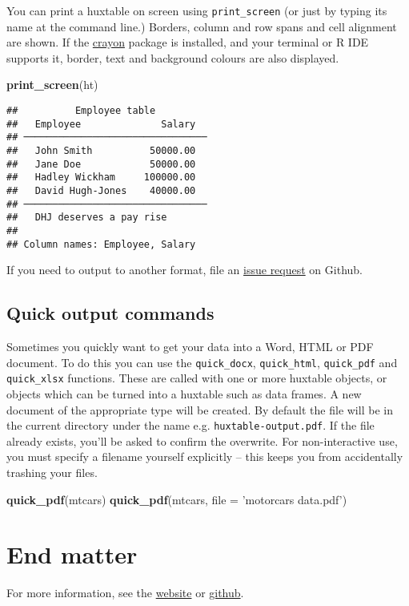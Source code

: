 \documentclass[]{article}
\newenvironment{Shaded}{\begin{snugshade}}{\end{snugshade}}
\newcommand{\KeywordTok}[1]{\textcolor[rgb]{0.13,0.29,0.53}{\textbf{#1}}}
\newcommand{\DataTypeTok}[1]{\textcolor[rgb]{0.13,0.29,0.53}{#1}}
\newcommand{\StringTok}[1]{\textcolor[rgb]{0.31,0.60,0.02}{#1}}
\newcommand{\NormalTok}[1]{#1}
\begin{document}
You can print a huxtable on screen using \texttt{print\_screen} (or just
by typing its name at the command line.) Borders, column and row spans
and cell alignment are shown. If the
\href{https://cran.r-project.org/package=crayon}{crayon} package is
installed, and your terminal or R IDE supports it, border, text and
background colours are also displayed.

\begin{Shaded}
\begin{Highlighting}[]
\KeywordTok{print_screen}\NormalTok{(ht)}
\end{Highlighting}
\end{Shaded}

\begin{verbatim}
##          Employee table         
##   Employee              Salary  
## ────────────────────────────────
##   John Smith          50000.00  
##   Jane Doe            50000.00  
##   Hadley Wickham     100000.00  
##   David Hugh-Jones    40000.00  
## ────────────────────────────────
##   DHJ deserves a pay rise       
## 
## Column names: Employee, Salary
\end{verbatim}

\FloatBarrier

If you need to output to another format, file an
\href{https://github.com/hughjonesd/huxtable}{issue request} on Github.

\subsection{Quick output commands}\label{quick-output-commands}

Sometimes you quickly want to get your data into a Word, HTML or PDF
document. To do this you can use the \texttt{quick\_docx},
\texttt{quick\_html}, \texttt{quick\_pdf} and \texttt{quick\_xlsx}
functions. These are called with one or more huxtable objects, or
objects which can be turned into a huxtable such as data frames. A new
document of the appropriate type will be created. By default the file
will be in the current directory under the name e.g.
\texttt{huxtable-output.pdf}. If the file already exists, you'll be
asked to confirm the overwrite. For non-interactive use, you must
specify a filename yourself explicitly -- this keeps you from
accidentally trashing your files.

\begin{Shaded}
\begin{Highlighting}[]
\KeywordTok{quick_pdf}\NormalTok{(mtcars) }
\KeywordTok{quick_pdf}\NormalTok{(mtcars, }\DataTypeTok{file =} \StringTok{'motorcars data.pdf'}\NormalTok{)}
\end{Highlighting}
\end{Shaded}

\FloatBarrier

\section{End matter}\label{end-matter}

For more information, see the
\href{https://hughjonesd.github.io/huxtable}{website} or
\href{https://github.com/hughjonesd/huxtable}{github}.
\end{document}
